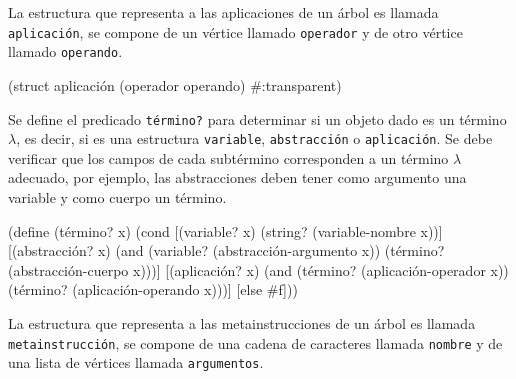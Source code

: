 \documentclass[letterpaper,twoside,openright,11pt]{book}
\begin{document}
\eatline
{}\nwendcode{}\nwdocspar

La estructura que representa a las aplicaciones de un árbol es llamada {\tt{}\protect{}aplicación}, se compone de un vértice llamado {\tt{}operador} y de otro vértice llamado {\tt{}operando}.


\nwenddocs{}\plusendmoddef
(struct aplicación (operador operando) #:transparent)

\eatline
{}\nwendcode{}\nwdocspar

Se define el predicado {\tt{}\protect{}término?} para determinar si un objeto dado es un término \( λ \), es decir, si es una estructura {\tt{}\protect{}variable}, {\tt{}\protect{}abstracción} o {\tt{}\protect{}aplicación}. Se debe verificar que los campos de cada subtérmino corresponden a un término \( λ \) adecuado, por ejemplo, las abstracciones deben tener como argumento una variable y como cuerpo un término.

\nwenddocs{}\endmoddef
(define (término? x)
  (cond
   [(variable? x)    (string? (variable-nombre x))]
   [(abstracción? x) (and (variable? (abstracción-argumento x))
                          (término? (abstracción-cuerpo x)))]
   [(aplicación? x)  (and (término? (aplicación-operador x))
                          (término? (aplicación-operando x)))]
   [else             #f]))

\eatline
{}\nwendcode{}\nwdocspar
La estructura que representa a las metainstrucciones de un árbol es llamada {\tt{}\protect{}metainstrucción}, se compone de una cadena de caracteres llamada {\tt{}nombre} y de una lista de vértices llamada {\tt{}argumentos}.
\end{document}
